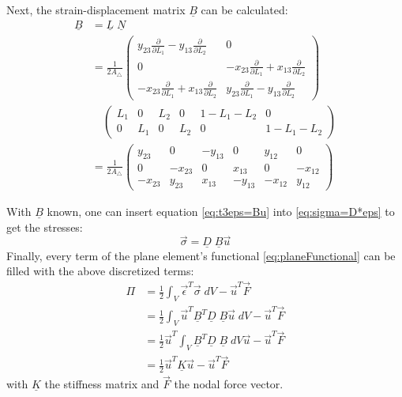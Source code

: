   Next, the strain-displacement matrix $\underline{B}$ can be calculated:
  \begin{align}
  \underline{B} &= \underline{L}\; \underline{N} \nonumber\\
  &= \frac{1}{2 A_\triangle} \begin{pmatrix}
  y_{23}\frac{\partial}{\partial L_1} - y_{13}\frac{\partial}{\partial L_2} & 0 \\
  0 & -x_{23}\frac{\partial}{\partial L_1} + x_{13}\frac{\partial}{\partial L_2} \\
  -x_{23}\frac{\partial}{\partial L_1} + x_{13}\frac{\partial}{\partial L_2} & y_{23}\frac{\partial}{\partial L_1} - y_{13}\frac{\partial}{\partial L_2}
  \end{pmatrix} \nonumber\\
  & \quad \begin{pmatrix}
  L_1 & 0 & L_2 & 0 & 1-L_1-L_2 & 0 \\
  0 & L_1 & 0 & L_2 & 0 & 1-L_1-L_2
  \end{pmatrix} \nonumber\\
  &= \frac{1}{2 A_\triangle} \begin{pmatrix}
  y_{23} & 0 & -y_{13} & 0 & y_{12} & 0 \\
  0 & -x_{23} & 0 & x_{13} & 0 & -x_{12} \\
  -x_{23} & y_{23} & x_{13} & -y_{13} & -x_{12} & y_{12}
  \end{pmatrix}
  \end{align}
  
  With $\underline{B}$ known, one can insert equation \ref{eq:t3eps=Bu} into \ref{eq:sigma=D*eps} to get the stresses:
  \begin{equation} \label{eq:t3sigma=DBu}
  \vec{\sigma} = \underline{D}\;\underline{B} \vec{u}
  \end{equation}
  Finally, every term of the plane element's functional \ref{eq:planeFunctional} can be filled with the above discretized terms:
  \begin{align}\label{eq:t3functional}
  \Pi &= \frac{1}{2} \int_{V}\vec{\epsilon}^T\vec{\sigma}\;dV - \vec{u}^T \vec{F} \nonumber\\
      &= \frac{1}{2} \int_{V}\vec{u}^T \underline{B}^T\underline{D}\;\underline{B}\vec{u}\;dV - \vec{u}^T \vec{F} \nonumber\\
      &= \frac{1}{2} \vec{u}^T \int_{V} \underline{B}^T\underline{D}\;\underline{B}\;dV \vec{u}- \vec{u}^T \vec{F} \nonumber\\
      &= \frac{1}{2}\vec{u}^T \underline{K} \vec{u} - \vec{u}^T \vec{F}
  \end{align}
  with $\underline{K}$ the stiffness matrix and $\vec{F}$ the nodal force vector.
  
